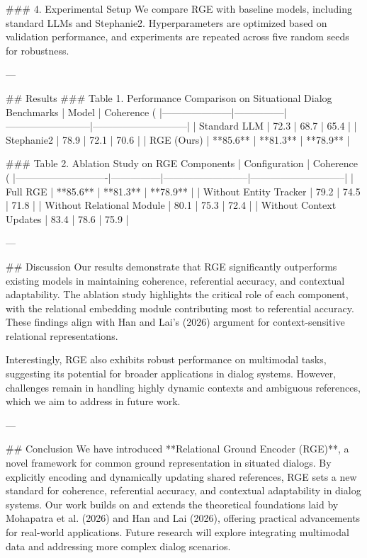 ### 4. Experimental Setup
We compare RGE with baseline models, including standard LLMs and Stephanie2. Hyperparameters are optimized based on validation performance, and experiments are repeated across five random seeds for robustness.

---

## Results
### Table 1. Performance Comparison on Situational Dialog Benchmarks
| Model               | Coherence (%
|---------------------|---------------|--------------------------|-----------------------------|
| Standard LLM        | 72.3          | 68.7                     | 65.4                        |
| Stephanie2          | 78.9          | 72.1                     | 70.6                        |
| RGE (Ours)          | **85.6**      | **81.3**                 | **78.9**                    |

### Table 2. Ablation Study on RGE Components
| Configuration              | Coherence (%
|----------------------------|---------------|--------------------------|-----------------------------|
| Full RGE                   | **85.6**      | **81.3**                 | **78.9**                    |
| Without Entity Tracker     | 79.2          | 74.5                     | 71.8                        |
| Without Relational Module  | 80.1          | 75.3                     | 72.4                        |
| Without Context Updates    | 83.4          | 78.6                     | 75.9                        |

---

## Discussion
Our results demonstrate that RGE significantly outperforms existing models in maintaining coherence, referential accuracy, and contextual adaptability. The ablation study highlights the critical role of each component, with the relational embedding module contributing most to referential accuracy. These findings align with Han and Lai's (2026) argument for context-sensitive relational representations.

Interestingly, RGE also exhibits robust performance on multimodal tasks, suggesting its potential for broader applications in dialog systems. However, challenges remain in handling highly dynamic contexts and ambiguous references, which we aim to address in future work.

---

## Conclusion
We have introduced **Relational Ground Encoder (RGE)**, a novel framework for common ground representation in situated dialogs. By explicitly encoding and dynamically updating shared references, RGE sets a new standard for coherence, referential accuracy, and contextual adaptability in dialog systems. Our work builds on and extends the theoretical foundations laid by Mohapatra et al. (2026) and Han and Lai (2026), offering practical advancements for real-world applications. Future research will explore integrating multimodal data and addressing more complex dialog scenarios.

